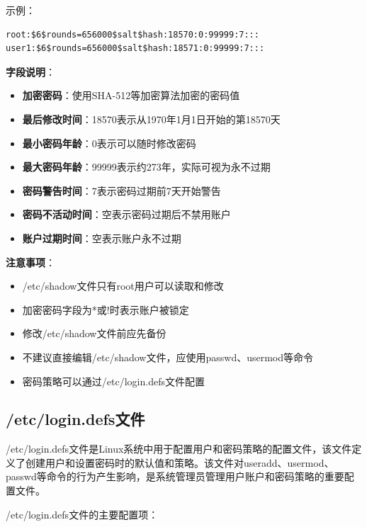 \documentclass[12pt,UTF8]{ctexbook}
\begin{document}
示例：

\begin{verbatim}
root:$6$rounds=656000$salt$hash:18570:0:99999:7:::
user1:$6$rounds=656000$salt$hash:18571:0:99999:7:::\end{verbatim}

\textbf{字段说明}：
\begin{itemize}
    \item \textbf{加密密码}：使用SHA-512等加密算法加密的密码值
    \item \textbf{最后修改时间}：18570表示从1970年1月1日开始的第18570天
    \item \textbf{最小密码年龄}：0表示可以随时修改密码
    \item \textbf{最大密码年龄}：99999表示约273年，实际可视为永不过期
    \item \textbf{密码警告时间}：7表示密码过期前7天开始警告
    \item \textbf{密码不活动时间}：空表示密码过期后不禁用账户
    \item \textbf{账户过期时间}：空表示账户永不过期
\end{itemize}

\textbf{注意事项}：
\begin{itemize}
    \item /etc/shadow文件只有root用户可以读取和修改
    \item 加密密码字段为*或!时表示账户被锁定
    \item 修改/etc/shadow文件前应先备份
    \item 不建议直接编辑/etc/shadow文件，应使用passwd、usermod等命令
    \item 密码策略可以通过/etc/login.defs文件配置
\end{itemize}

\subsection{/etc/login.defs文件}

/etc/login.defs文件是Linux系统中用于配置用户和密码策略的配置文件，该文件定义了创建用户和设置密码时的默认值和策略。该文件对useradd、usermod、passwd等命令的行为产生影响，是系统管理员管理用户账户和密码策略的重要配置文件。

/etc/login.defs文件的主要配置项：
\end{document}
